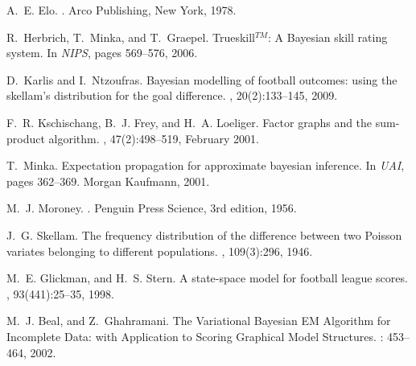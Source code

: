 \begin{thebibliography}{}
A.~E. Elo.
.
\newblock Arco Publishing, New York, 1978.

R.~Herbrich, T.~Minka, and T.~Graepel.
\newblock Trueskill$^{TM}$: A {B}ayesian skill rating system.
\newblock In {\em NIPS}, pages 569--576, 2006.

D.~Karlis and I.~Ntzoufras.
\newblock Bayesian modelling of football outcomes: using the skellam's
  distribution for the goal difference.
, 20(2):133--145, 2009.

F.~R. Kschischang, B.~J. Frey, and H.~A. Loeliger.
\newblock Factor graphs and the sum-product algorithm.
, 47(2):498--519,
  February 2001.

T.~Minka.
\newblock Expectation propagation for approximate bayesian inference.
\newblock In {\em UAI}, pages
  362--369. Morgan Kaufmann, 2001.



M.~J. Moroney.
.
\newblock Penguin Press Science, 3rd edition, 1956.

J.~G. Skellam.
\newblock The frequency distribution of the difference between two
{P}oisson variates belonging to different populations.
, 109(3):296,
  1946.

M.~E. Glickman, and H.~S. Stern.
\newblock A state-space model for football league scores.
, 93(441):25--35,
  1998.

M.~J. Beal, and Z.~Ghahramani.
\newblock The Variational {B}ayesian {EM} Algorithm for Incomplete Data: with
	Application to Scoring Graphical Model Structures.
: 453--464,
2002.


\end{thebibliography}
